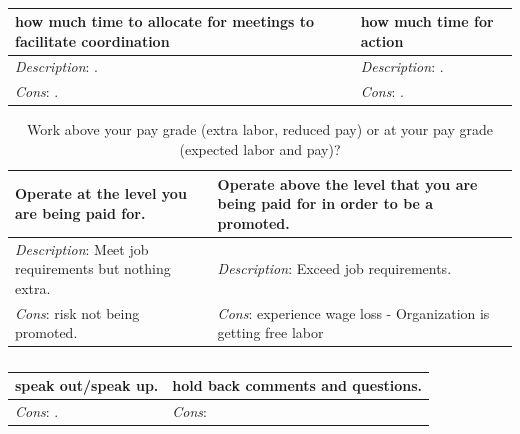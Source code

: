 \begin{center}
\begin{table}[ht]
\begin{tabular}{ | m{\dilemmatablewidth}| m{\dilemmatablewidth} | } 
  \hline
  \textbf{how much time to allocate for meetings to facilitate coordination} &
  \textbf{how much time for action} \\
  \hline
  \textit{Description}: . &
  \textit{Description}: . \\
  \hline
  \textit{Cons}: . & 
  \textit{Cons}: . \\
  \hline
\end{tabular}
\caption{
}
\label{table:meetings-versus-work}
\end{table}
\end{center}


\begin{center}
\begin{table}[ht]
\begin{tabular}{ | m{\dilemmatablewidth}| m{\dilemmatablewidth} | } 
  \hline
  \textbf{Operate at the level you are being paid for.} &
  \textbf{Operate above the level that you are being paid for in order to be a promoted.} \\
  \hline
  \textit{Description}: Meet job requirements but nothing extra. &
  \textit{Description}: Exceed job requirements. \\
  \hline
  \textit{Cons}: risk not being promoted. & 
  \textit{Cons}: experience wage loss - Organization is getting free labor \\
  \hline
\end{tabular}
\caption{Work above your pay grade (extra labor, reduced pay) or at your pay grade (expected labor and pay)?
}
\label{table:work_extra_or_work_as_expected}
\end{table}
\end{center}


\begin{center}
\begin{table}[ht]
\begin{tabular}{ | m{\dilemmatablewidth}| m{\dilemmatablewidth} | } 
  \hline
  \textbf{speak out/speak up.} &
  \textbf{hold back comments and questions.} \\
  \hline
  \textit{Cons}: . & 
  \textit{Cons}:  \\
  \hline
\end{tabular}
\caption{
}
\label{table:speak-up-or-hold-back}
\end{table}
\end{center}


